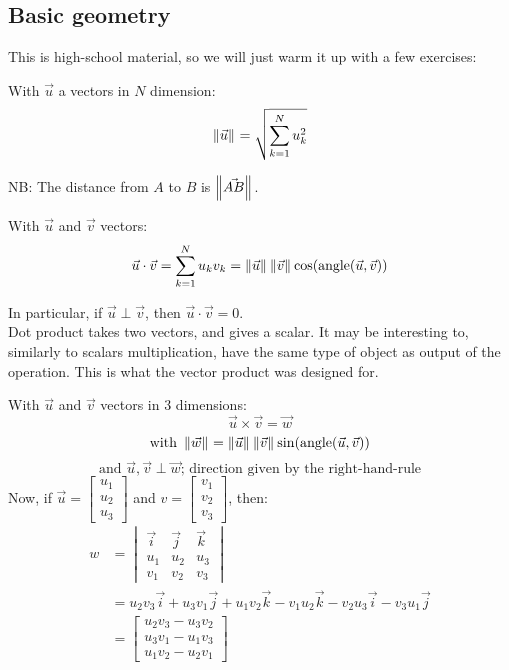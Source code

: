 \subsection{Basic geometry}
This is high-school material, so we will just warm it up with a few exercises:
\begin{definition}[Norm]
    With $\vec{u}$ a vectors in $N$ dimension:
    $$\left\lVert \vec{u} \right\rVert_{} = \sqrt{\sum_{k=1}^{N} u_k^2}$$
\end{definition}
NB: The distance from $A$ to $B$ is $\left\lVert \vec{AB} \right\rVert_{}$.
\begin{definition}
    With $\vec{u}$ and $\vec{v}$ vectors:
    $$\vec{u} \cdot \vec{v} = \sum_{k=1}^{N} u_kv_k = \left\lVert \vec{u} \right\rVert_{}\left\lVert \vec{v} \right\rVert_{}\cos(\text{angle}(\vec{u},\vec{v}))$$
\end{definition}
In particular, if $\vec{u} \perp \vec{v}$, then $\vec{u} \cdot \vec{v} = 0$.\\
Dot product takes two vectors, and gives a scalar.
It may be interesting to, similarly to scalars multiplication, have the same type of object as output of the operation.
This is what the vector product was designed for.
\begin{definition}
    With $\vec{u}$ and $\vec{v}$ vectors in $3$ dimensions:
    $$\vec{u} \times \vec{v} = \vec{w}$$
    $$\text{with } \left\lVert \vec{w} \right\rVert_{} = \left\lVert \vec{u} \right\rVert_{}\left\lVert \vec{v} \right\rVert_{}\sin(\text{angle}(\vec{u},\vec{v}))$$
    $$\text{and } \vec{u},\vec{v} \perp \vec{w} \text{; direction given by the right-hand-rule}$$
    Now, if $\vec{u} = \begin{bmatrix} u_1 \\ u_2 \\ u_3 \end{bmatrix}$ and $v = \begin{bmatrix} v_1 \\ v_2 \\ v_3 \end{bmatrix}$, then:
    \begin{align*}
        w &= \begin{vmatrix} \vec{i} & \vec{j} & \vec{k} \\ u_1 & u_2 & u_3 \\ v_1 & v_2 & v_3 \end{vmatrix} \\
        &= u_2v_3\vec{i} + u_3v_1\vec{j} + u_1v_2\vec{k} - v_1u_2\vec{k} - v_2u_3\vec{i} - v_3u_1\vec{j} \\
        &= \begin{bmatrix} u_2v_3-u_3v_2 \\ u_3v_1-u_1v_3 \\ u_1v_2-u_2v_1 \end{bmatrix}
    \end{align*}
\end{definition}

